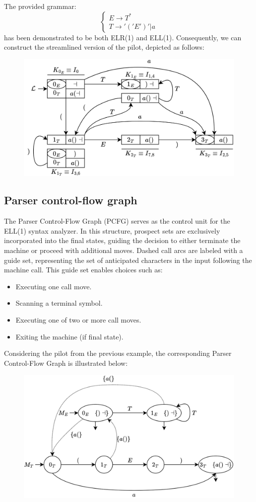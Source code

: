 \begin{example}
    The provided grammar:
    \[\begin{cases}
        E \rightarrow T^{*} \\
        T \rightarrow '('E')'|a
    \end{cases}\]
    has been demonstrated to be both ELR(1) and ELL(1). 
    Consequently, we can construct the streamlined version of the pilot, depicted as follows:
    \begin{figure}[H]
        \centering
        \includegraphics[width=0.6\linewidth]{images/pil1.png}
    \end{figure}
\end{example}

\subsection{Parser control-flow graph}
The Parser Control-Flow Graph (PCFG) serves as the control unit for the ELL(1) syntax analyzer. 
In this structure, prospect sets are exclusively incorporated into the final states, guiding the decision to either terminate the machine or proceed with additional moves.
Dashed call arcs are labeled with a guide set, representing the set of anticipated characters in the input following the machine call. 
This guide set enables choices such as:
\begin{itemize}
    \item Executing one call move. 
    \item Scanning a terminal symbol. 
    \item Executing one of two or more call moves. 
    \item Exiting the machine (if final state).
\end{itemize}
\begin{example}
    Considering the pilot from the previous example, the corresponding Parser Control-Flow Graph is illustrated below:
    \begin{figure}[H]
        \centering
        \includegraphics[width=0.6\linewidth]{images/pcfg.png}
    \end{figure}
\end{example}

